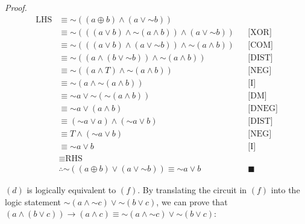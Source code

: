 \documentclass[11pt, notitlepage]{article}
\newcommand*{\oldneg}{\mathord{\sim}}
\begin{document}
\begin{enumerate}
\textit{Proof.}
\vspace{-25pt}
\begin{align*}
 	\textrm{LHS} &\equiv \oldneg ((a \oplus b) \wedge (a \vee \oldneg b))\\
 		&\equiv \oldneg (((a \vee b) \wedge \oldneg (a \wedge b)) \wedge (a \vee \oldneg b)) && \textrm{[XOR]}\\
 		&\equiv \oldneg (((a \vee b) \wedge (a \vee \oldneg b)) \wedge \oldneg (a \wedge b)) && \textrm{[COM]}\\
 		&\equiv \oldneg ((a \wedge (b \vee \oldneg b)) \wedge \oldneg (a \wedge b)) && \textrm{[DIST]}\\
 		&\equiv \oldneg ((a \wedge T) \wedge \oldneg (a \wedge b)) && \textrm{[NEG]}\\
 		&\equiv \oldneg (a \wedge \oldneg (a \wedge b)) && \textrm{[I]}\\
 		&\equiv \oldneg a \vee \oldneg (\oldneg (a \wedge b)) && \textrm{[DM]}\\
 		&\equiv \oldneg a \vee (a \wedge b) && \textrm{[DNEG]}\\
 		&\equiv (\oldneg a \vee a) \wedge (\oldneg a \vee b) && \textrm{[DIST]}\\
 		&\equiv T \wedge (\oldneg a \vee b) && \textrm{[NEG]}\\
 		&\equiv \oldneg a \vee b && \textrm{[I]}\\
 		&\equiv \textrm{RHS}\\
 		&\therefore \oldneg ((a \oplus b) \vee (a \vee \oldneg b)) \equiv \oldneg a \vee b && \blacksquare
\end{align*}

$(d)$ is logically equivalent to $(f)$. By translating the circuit in $(f)$ into the logic statement $\oldneg (a \wedge \oldneg c) \vee \oldneg (b \vee c)$, we can prove that $(a \wedge (b \vee c)) \to (a \wedge c) \equiv \oldneg (a \wedge \oldneg c) \vee \oldneg (b \vee c)$:


\end{enumerate}
\end{document}
